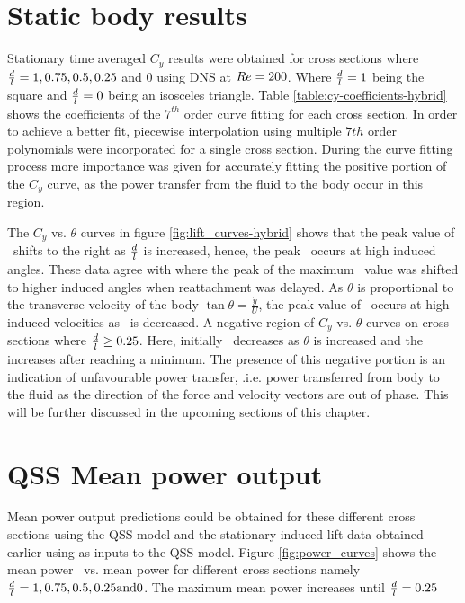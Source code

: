 \section{Static body results}
\label{sec:cross-sec-Static body results}


Stationary time averaged $C_y$ results were obtained for cross sections where $\frac{d}{l}=1,0.75,0.5,0.25$ and $0$ using DNS at $Re=200$. Where $\frac{d}{l}=1$ being the square and $\frac{d}{l}=0$ being an isosceles  triangle. Table \ref{table:cy-coefficients-hybrid} shows the coefficients of the $7^{th}$ order curve fitting for each cross section. In order to achieve a better fit, piecewise interpolation using multiple $7th$ order polynomials were incorporated for a single cross section. During the curve fitting process more importance was given for accurately fitting  the positive portion of the $C_{y}$ curve, as the power transfer from the fluid to the body occur in this region. 

 

The $C_y$ vs. $\theta$ curves in figure \ref{fig:lift_curves-hybrid} shows that the peak value of \cy\ shifts to the right as $\frac{d}{l}$ is increased, hence, the peak \cy\ occurs at high induced angles.  These data agree with \citet{Luo1994} where the peak of the maximum \cy\ value was shifted to higher induced angles when reattachment was delayed. As $\theta$ is proportional to the transverse velocity of the body $\tan{\theta}=\frac{\dot{y}}{U}$, the peak value of \cy\ occurs at high induced velocities as \ratio\ is decreased. A negative region of $C_y$ vs. $\theta$ curves on cross sections where $\frac{d}{l}\geq0.25$. Here, initially \cy\ decreases as $\theta$ is increased and the increases after reaching a minimum. The presence of this negative portion is an indication of unfavourable power transfer, .i.e. power transferred from body to the fluid as the direction of the force and velocity vectors are out of phase. This will be further discussed in the upcoming sections of this chapter.    

 
 
 \section{QSS Mean power output}
 \label{sec:cross-sec-qss-mean power}
 
 
 
 Mean power output predictions could be obtained for these different cross sections using the QSS model and the stationary induced lift data obtained earlier using as inputs to the QSS model. Figure \ref{fig:power_curves} shows the mean power \massdamp\ vs. mean power for different cross sections namely $\frac{d}{l}=1,0.75,0.5,0.25 \text{and} 0$. The maximum mean power increases until $\frac{d}{l}=0.25$ 
 
 
 
 



